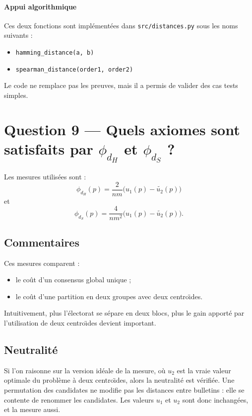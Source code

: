 \documentclass[11pt,a4paper]{article}
\begin{document}
\paragraph{Appui algorithmique}
Ces deux fonctions sont impl\'ement\'ees dans \texttt{src/distances.py} sous les noms suivants :
\begin{itemize}[leftmargin=*]
    \item \texttt{hamming\_distance(a, b)}
    \item \texttt{spearman\_distance(order1, order2)}
\end{itemize}

Le code ne remplace pas les preuves, mais il a permis de valider des cas tests simples.

\section{Question 9 --- Quels axiomes sont satisfaits par \texorpdfstring{$\phi_{d_H}$}{phi dH} et \texorpdfstring{$\phi_{d_S}$}{phi dS} ?}

Les mesures utilis\'ees sont :
\[
\phi_{d_H}(p)=\frac{2}{nm}\bigl(u_1(p)-\widetilde{u_2}(p)\bigr)
\]
et
\[
\phi_{d_S}(p)=\frac{4}{nm^2}\bigl(u_1(p)-\widetilde{u_2}(p)\bigr).
\]

\subsection*{Commentaires}

Ces mesures comparent :
\begin{itemize}[leftmargin=*]
    \item le co\^ut d'un consensus global unique ;
    \item le co\^ut d'une partition en deux groupes avec deux centro\"\i des.
\end{itemize}

Intuitivement, plus l'\'electorat se s\'epare en deux blocs, plus le gain apport\'e par l'utilisation de deux centro\"\i des devient important.

\subsection*{Neutralit\'e}

Si l'on raisonne sur la version id\'eale de la mesure, o\`u \(u_2\) est la vraie valeur optimale du probl\`eme \`a deux centro\"\i des, alors la neutralit\'e est v\'erifi\'ee. Une permutation des candidates ne modifie pas les distances entre bulletins : elle se contente de renommer les candidates. Les valeurs \(u_1\) et \(u_2\) sont donc inchang\'ees, et la mesure aussi.
\end{document}
